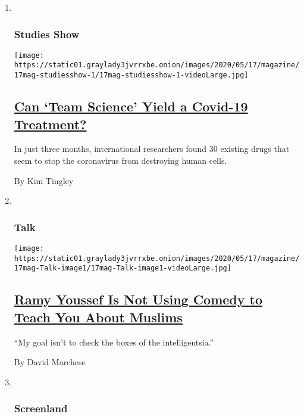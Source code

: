 \begin{enumerate}
\def\labelenumi{\arabic{enumi}.}
\item ~
  \hypertarget{studies-show}{%
  \subsubsection{Studies Show}\label{studies-show}}

  \texttt{[image: https://static01.graylady3jvrrxbe.onion/images/2020/05/17/magazine/17mag-studiesshow-1/17mag-studiesshow-1-videoLarge.jpg]}

  \hypertarget{can-team-science-yield-a-covid-19-treatment}{%
  \subsection{\texorpdfstring{\href{/2020/05/13/magazine/can-team-science-yield-a-covid-19-treatment.html}{Can
  `Team Science' Yield a Covid-19
  Treatment?}}{Can `Team Science' Yield a Covid-19 Treatment?}}\label{can-team-science-yield-a-covid-19-treatment}}

  In just three months, international researchers found 30 existing
  drugs that seem to stop the coronavirus from destroying human cells.

  By Kim Tingley
\item ~
  \hypertarget{talk}{%
  \subsubsection{Talk}\label{talk}}

  \texttt{[image: https://static01.graylady3jvrrxbe.onion/images/2020/05/17/magazine/17mag-Talk-image1/17mag-Talk-image1-videoLarge.jpg]}

  \hypertarget{ramy-youssef-is-not-using-comedy-to-teach-you-about-muslims}{%
  \subsection{\texorpdfstring{\href{/interactive/2020/05/12/magazine/ramy-youssef-interview.html}{Ramy
  Youssef Is Not Using Comedy to Teach You About
  Muslims}}{Ramy Youssef Is Not Using Comedy to Teach You About Muslims}}\label{ramy-youssef-is-not-using-comedy-to-teach-you-about-muslims}}

  ``My goal isn't to check the boxes of the intelligentsia.''

  By David Marchese
\item ~
  \hypertarget{screenland}{%
  \subsubsection{Screenland}\label{screenland}}


\end{enumerate}
